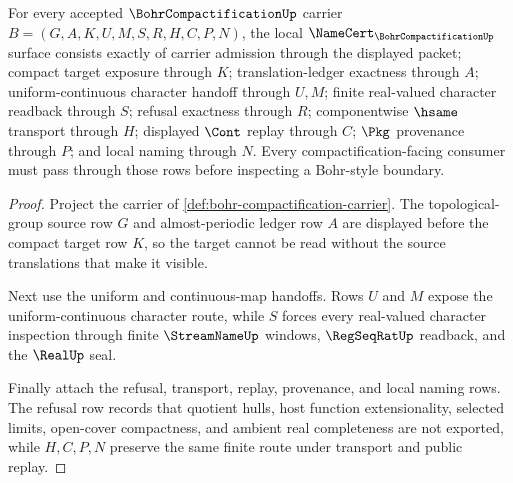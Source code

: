 \begin{theorem}
\label{thm:bohr-compactification-namecert-obligations}
For every accepted $\BohrCompactificationUp$ carrier $B=(G,A,K,U,M,S,R,H,C,P,N)$, the local $\NameCert_{\BohrCompactificationUp}$ surface consists exactly of carrier admission through the displayed packet; compact target exposure through $K$; translation-ledger exactness through $A$; uniform-continuous character handoff through $U,M$; finite real-valued character readback through $S$; refusal exactness through $R$; componentwise $\hsame$ transport through $H$; displayed $\Cont$ replay through $C$; $\Pkg$ provenance through $P$; and local naming through $N$. Every compactification-facing consumer must pass through those rows before inspecting a Bohr-style boundary.
\end{theorem}
\begin{proof}
Project the carrier of \autoref{def:bohr-compactification-carrier}. The topological-group source row $G$ and almost-periodic ledger row $A$ are displayed before the compact target row $K$, so the target cannot be read without the source translations that make it visible.

Next use the uniform and continuous-map handoffs. Rows $U$ and $M$ expose the uniform-continuous character route, while $S$ forces every real-valued character inspection through finite $\StreamNameUp$ windows, $\RegSeqRatUp$ readback, and the $\RealUp$ seal.

Finally attach the refusal, transport, replay, provenance, and local naming rows. The refusal row records that quotient hulls, host function extensionality, selected limits, open-cover compactness, and ambient real completeness are not exported, while $H,C,P,N$ preserve the same finite route under transport and public replay.
\end{proof}



